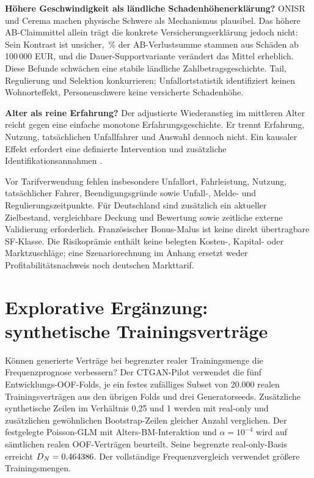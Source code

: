 \documentclass[11pt,a4paper]{article}
\begin{document}
\textbf{Höhere Geschwindigkeit als ländliche Schadenhöhenerklärung?} ONISR und Cerema machen physische Schwere als Mechanismus plausibel. Das höhere AB-Claimmittel allein trägt die konkrete Versicherungserklärung jedoch nicht: Sein Kontrast ist unsicher, \RuralTailShare\,\% der AB-Verlustsumme stammen aus Schäden ab 100\,000 EUR, und die Dauer-Supportvariante verändert das Mittel erheblich. Diese Befunde schwächen eine stabile ländliche Zahlbetragsgeschichte. Tail, Regulierung und Selektion konkurrieren; Unfallortstatistik identifiziert keinen Wohnorteffekt, Personenschwere keine versicherte Schadenhöhe.

\textbf{Alter als reine Erfahrung?} Der adjustierte Wiederanstieg im mittleren Alter reicht gegen eine einfache monotone Erfahrungsgeschichte. Er trennt Erfahrung, Nutzung, tatsächlichen Unfallfahrer und Auswahl dennoch nicht. Ein kausaler Effekt erfordert eine definierte Intervention und zusätzliche Identifikationsannahmen \cite{hernan}.

Vor Tarifverwendung fehlen insbesondere Unfallort, Fahrleistung, Nutzung, tatsächlicher Fahrer, Beendigungsgründe sowie Unfall-, Melde- und Regulierungszeitpunkte. Für Deutschland sind zusätzlich ein aktueller Zielbestand, vergleichbare Deckung und Bewertung sowie zeitliche externe Validierung erforderlich. Französischer Bonus-Malus ist keine direkt übertragbare SF-Klasse. Die Risikoprämie enthält keine belegten Kosten-, Kapital- oder Marktzuschläge; eine Szenariorechnung im Anhang ersetzt weder Profitabilitätsnachweis noch deutschen Markttarif.

\clearpage
\section{Explorative Ergänzung: synthetische Trainingsverträge}
Können generierte Verträge bei begrenzter realer Trainingsmenge die Frequenzprognose verbessern? Der CTGAN-Pilot verwendet die fünf Entwicklungs-OOF-Folds, je ein festes zufälliges Subset von 20.000 realen Trainingsverträgen aus den übrigen Folds und drei Generatorseeds. Zusätzliche synthetische Zeilen im Verhältnis 0,25 und 1 werden mit real-only und zusätzlichen gewöhnlichen Bootstrap-Zeilen gleicher Anzahl verglichen. Der festgelegte Poisson-GLM mit Alters-BM-Interaktion und $\alpha=10^{-4}$ wird auf sämtlichen realen OOF-Verträgen beurteilt. Seine begrenzte real-only-Basis erreicht $D_N=0{,}464386$. Der vollständige Frequenzvergleich verwendet größere Trainingsmengen.
\end{document}
